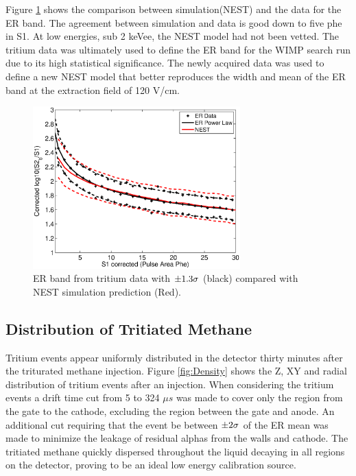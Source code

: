 Figure \ref{fig:NEST_v_Data} shows the comparison between simulation(NEST) and the data for the ER band. The agreement between simulation and data is good down to five phe in S1. At low energies, sub 2 keVee, the NEST model had not been vetted. The tritium data was ultimately used to define the ER band for the WIMP search run due to its high statistical significance. The newly acquired data was used to define a new NEST model that better reproduces the width and mean of the ER band at the extraction field of 120 V/cm.

\begin{figure}[H]\centering
\includegraphics[width=80mm]{CH3T_DATA_NEST_fid_30_lux10_20130813T1120_cp05328.eps}
\caption{ER band from tritium data with $\rm \pm 1.3 \sigma$ (black) compared with NEST simulation prediction (Red).}
\label{fig:NEST_v_Data}
\end{figure}


\subsection{Distribution of Tritiated Methane}

 Tritium events appear uniformly distributed in the detector thirty minutes after the triturated methane injection. Figure \ref{fig:Density} shows the Z, XY and radial distribution of tritium events after an injection. When considering the tritium events a drift time cut from 5 to 324 $\mu s$ was made to cover only the region from the gate to the cathode, excluding the region between the gate and anode. An additional cut requiring that the event be between $\rm \pm 2 \sigma$ of the ER mean was made to minimize the leakage of residual alphas from the walls and cathode. The tritiated methane quickly dispersed throughout the liquid decaying in all regions on the detector, proving to be an ideal low energy calibration source.
 
